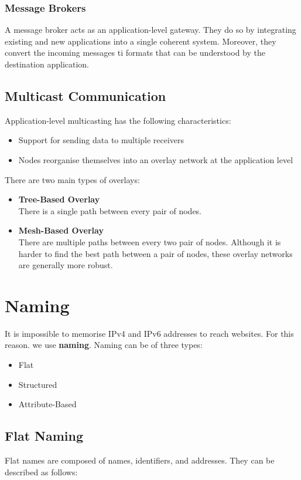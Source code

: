 \documentclass{article}
\begin{document}
\subsubsection{Message Brokers}
A message broker acts as an application-level gateway. They do so by integrating existing and new applications into a single coherent system. Moreover, they convert the incoming messages ti formats that can be understood by the destination application.

\subsection{Multicast Communication}
Application-level multicasting has the following characteristics:

\begin{itemize}
	\item Support for sending data to multiple receivers
	\item Nodes reorganise themselves into an overlay network at the application level
\end{itemize}

\noindent There are two main types of overlays:

\begin{itemize}
	\item \textbf{Tree-Based Overlay} \\
	There is a single path between every pair of nodes.
	
	\item \textbf{Mesh-Based Overlay} \\
	There are multiple paths between every two pair of nodes. Although it is harder to find the best path between a pair of nodes, these overlay networks are generally more robust.
\end{itemize}

\section{Naming}
It is impossible to memorise IPv4 and IPv6 addresses to reach websites. For this reason. we use \textbf{naming}. Naming can be of three types:

\begin{itemize}
	\item Flat
	\item Structured
	\item Attribute-Based
\end{itemize}

\subsection{Flat Naming}
Flat names are composed of names, identifiers, and addresses. They can be described as follows:
\end{document}
